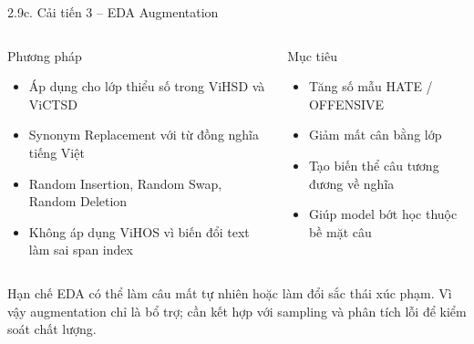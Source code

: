 \documentclass[11pt, aspectratio=169]{beamer}
\begin{document}
\begin{frame}[shrink=7]{2.9c. Cải tiến 3 -- EDA Augmentation}

\begin{columns}[T]
  \begin{block}{Phương pháp}
    \begin{itemize}
      \item Áp dụng cho lớp thiểu số trong ViHSD và ViCTSD
      \item Synonym Replacement với từ đồng nghĩa tiếng Việt
      \item Random Insertion, Random Swap, Random Deletion
      \item Không áp dụng ViHOS vì biến đổi text làm sai span index
    \end{itemize}
  \end{block}

  \begin{block}{Mục tiêu}
    \begin{itemize}
      \item Tăng số mẫu HATE / OFFENSIVE
      \item Giảm mất cân bằng lớp
      \item Tạo biến thể câu tương đương về nghĩa
      \item Giúp model bớt học thuộc bề mặt câu
    \end{itemize}
  \end{block}
\end{columns}

\vspace{0.3cm}
\begin{block}{Hạn chế}
  EDA có thể làm câu mất tự nhiên hoặc làm đổi sắc thái xúc phạm. Vì vậy augmentation chỉ là bổ trợ; cần kết hợp với sampling và phân tích lỗi để kiểm soát chất lượng.
\end{block}
\end{frame}
\end{document}
